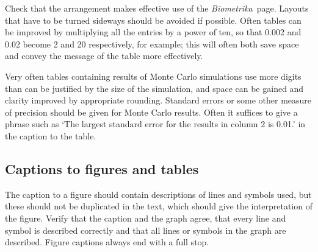 \documentclass[lineno]{biometrika}
\def\Bka{{\it Biometrika}}
\begin{document}
Check that the arrangement makes effective use
of the \Bka\ page. Layouts that have to be turned sideways should be avoided
if possible. 
Often tables can be improved by multiplying all the entries by a power of ten, so that 0.002 and
0.02 become 2 and 20 respectively, for example; this will often both save space and convey the message of the table more effectively. 

Very often tables containing results of Monte Carlo simulations use more digits than can be justified by the size of the simulation, and space can be gained and clarity improved by appropriate rounding.
Standard errors or some other measure of precision should be given for Monte Carlo results.
Often it suffices to give a phrase such as `The largest standard error for the results in column 2 is 0.01.' in the caption to the table.




\subsection{Captions to figures and tables}

The caption to a figure should contain descriptions of lines and symbols used, but these should not be duplicated in the text, which should give the interpretation of the figure.  Verify that the caption and the graph agree, that every line and symbol is described correctly and that all lines or symbols in the graph are described. Figure captions always end with a full stop. 
\end{document}

